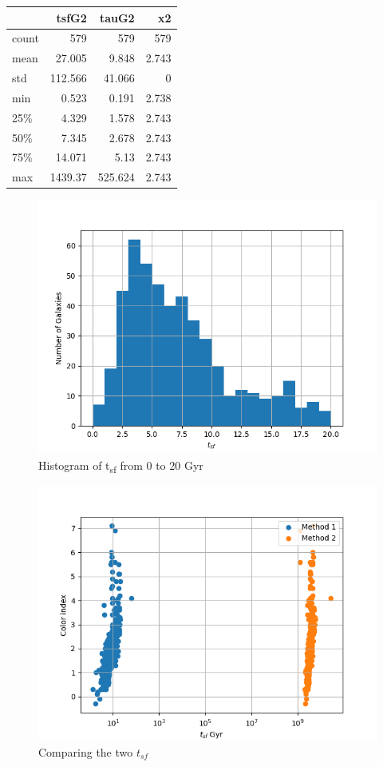 \documentclass[a4paper,twocolumn]{article}
\begin{document}
\begin{center}
\begin{tabular}{lrrr}
 & tsfG2 & tauG2 & x2\\[0pt]
\hline
count & 579 & 579 & 579\\[0pt]
mean & 27.005 & 9.848 & 2.743\\[0pt]
std & 112.566 & 41.066 & 0\\[0pt]
min & 0.523 & 0.191 & 2.738\\[0pt]
25\% & 4.329 & 1.578 & 2.743\\[0pt]
50\% & 7.345 & 2.678 & 2.743\\[0pt]
75\% & 14.071 & 5.13 & 2.743\\[0pt]
max & 1439.37 & 525.624 & 2.743\\[0pt]
\end{tabular}
\end{center}
\begin{figure}[!htpb]
\centering
\includegraphics[width=.9\linewidth]{./figs/tsf2-hist.png}
\caption{\label{fig:Histogram of t_{sf} from 0 to 20 Gyr}Histogram of t\textsubscript{sf} from 0 to 20 Gyr}
\end{figure}

\begin{figure}[!htpb]
\centering
\includegraphics[width=.9\linewidth]{./figs/tsf_tsf2.png}
\caption{\label{fig:Comparing the two $t_{sf}$}Comparing the two \(t_{sf}\)}
\end{figure}
\end{document}
